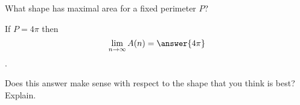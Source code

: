 \documentclass[handout,nooutcomes]{ximera}
\begin{document}
\begin{problem}
What shape has maximal area for a fixed perimeter $P$?
\begin{multipleChoice}
\end{multipleChoice}
\end{problem}

\bigskip

\begin{problem}
If $P = 4\pi$ then \[\lim_{n \to \infty} A(n) = \answer{4\pi}\].\\
\begin{freeResponse}
Does this answer make sense with respect to the shape that you think is best? Explain.
\end{freeResponse}
\end{problem}
\end{document}
